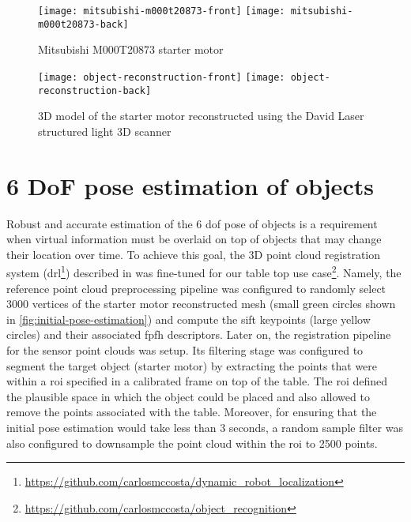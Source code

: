 \begin{figure}[!ht]
	\centering
	\texttt{[image: mitsubishi-m000t20873-front]}
	\texttt{[image: mitsubishi-m000t20873-back]}
	\caption{Mitsubishi M000T20873 starter motor}
	\label{fig:starter-motor}
\end{figure}

\begin{figure}[!ht]
	\centering
	\texttt{[image: object-reconstruction-front]}
	\hspace{1em}
	\texttt{[image: object-reconstruction-back]}
	\caption{3D model of the starter motor reconstructed using the David Laser structured light 3D scanner}
	\label{fig:object-reconstruction}
\end{figure}



\section{6 DoF pose estimation of objects}\label{sec:pose-estimation}

Robust and accurate estimation of the 6 \gls{dof} pose of objects is a requirement when virtual information must be overlaid on top of objects that may change their location over time. To achieve this goal, the 3D point cloud registration system (drl\footnote{\url{https://github.com/carlosmccosta/dynamic_robot_localization}}) described in \cite{Costa2016} was fine-tuned for our table top use case\footnote{\url{https://github.com/carlosmccosta/object_recognition}}. Namely, the reference point cloud preprocessing pipeline was configured to randomly select 3000 vertices of the starter motor reconstructed mesh (small green circles shown in \cref{fig:initial-pose-estimation}) and compute the \gls{sift} keypoints (large yellow circles) and their associated \gls{fpfh} descriptors. Later on, the registration pipeline for the sensor point clouds was setup. Its filtering stage was configured to segment the target object (starter motor) by extracting the points that were within a \gls{roi} specified in a calibrated frame on top of the table. The \gls{roi} defined the plausible space in which the object could be placed and also allowed to remove the points associated with the table. Moreover, for ensuring that the initial pose estimation would take less than 3 seconds, a random sample filter was also configured to downsample the point cloud within the \gls{roi} to 2500 points.

